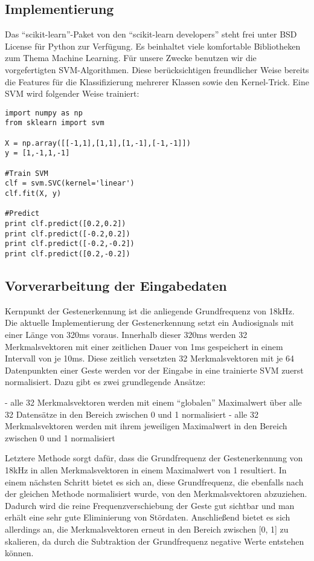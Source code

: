 \newpage

\subsection{Implementierung}

Das “scikit-learn”-Paket von den “scikit-learn developers” steht frei unter BSD License für Python zur Verfügung. Es beinhaltet viele komfortable Bibliotheken zum Thema Machine Learning. Für unsere Zwecke benutzen wir die vorgefertigten SVM-Algorithmen. Diese berücksichtigen freundlicher Weise bereits die Features für die Klassifizierung mehrerer Klassen sowie den Kernel-Trick. Eine SVM wird folgender Weise trainiert:

\begin{lstlisting}
import numpy as np
from sklearn import svm

X = np.array([[-1,1],[1,1],[1,-1],[-1,-1]])
y = [1,-1,1,-1]

#Train SVM
clf = svm.SVC(kernel='linear')
clf.fit(X, y)

#Predict
print clf.predict([0.2,0.2])
print clf.predict([-0.2,0.2])
print clf.predict([-0.2,-0.2])
print clf.predict([0.2,-0.2])
\end{lstlisting}


\subsection{Vorverarbeitung der Eingabedaten}

Kernpunkt der Gestenerkennung ist die anliegende Grundfrequenz von 18kHz. Die aktuelle Implementierung der Gestenerkennung setzt ein Audiosignals mit einer Länge von 320ms voraus. Innerhalb dieser 320ms werden 32 Merkmalsvektoren mit einer zeitlichen Dauer von 1ms gespeichert in einem Intervall von je 10ms. Diese zeitlich versetzten 32 Merkmalsvektoren mit je 64 Datenpunkten einer Geste werden vor der Eingabe in eine trainierte SVM zuerst normalisiert. Dazu gibt es zwei grundlegende Ansätze:

- alle 32 Merkmalsvektoren werden mit einem “globalen” Maximalwert über alle 32 Datensätze in den Bereich zwischen 0 und 1 normalisiert\newline
- alle 32 Merkmalsvektoren werden mit ihrem jeweiligen Maximalwert in den Bereich zwischen 0 und 1 normalisiert

Letztere Methode sorgt dafür, dass die Grundfrequenz der Gestenerkennung von 18kHz in allen Merkmalsvektoren in einem Maximalwert von 1 resultiert. In einem nächsten Schritt bietet es sich an, diese Grundfrequenz, die ebenfalls nach der gleichen Methode normalisiert wurde, von den Merkmalsvektoren abzuziehen. Dadurch wird die reine Frequenzverschiebung der Geste gut sichtbar und man erhält eine sehr gute Eliminierung von Stördaten. Anschließend bietet es sich allerdings an, die Merkmalsvektoren erneut in den Bereich zwischen [0, 1] zu skalieren, da durch die Subtraktion der Grundfrequenz negative Werte entstehen können.


